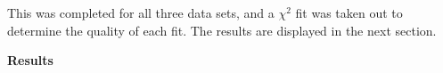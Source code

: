 \documentclass[11pt]{article}
\begin{document}
\begin{multicols}{2}
    \nd This was completed for all three data sets, and a $\chi^2$ fit was taken out to determine the quality of each fit. The results are displayed in the next section. 







    \vspace{10pt}

     \selectfont \textbf{Results}
    
     \selectfont






\end{multicols}
\end{document}
